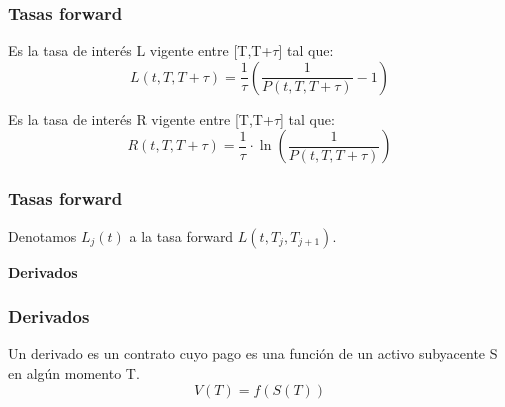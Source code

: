 
\begin{frame}
    \frametitle{Tasas forward}
    \begin{defin}
        Es la tasa de interés L vigente entre [T,T+$\tau$] tal que:
        \begin{equation*}
            L(t, T, T+\tau) = \frac{1}{\tau} \left( \frac{1}{P(t, T, T+\tau)} - 1\right)
        \end{equation*}
    \end{defin}
    \begin{defin}
        Es la tasa de interés R vigente entre [T,T+$\tau$] tal que:
        \begin{equation*}
            R(t, T, T+\tau) = \frac{1}{\tau} \cdot \ln\left(\frac{1}{P(t, T, T+\tau)}\right)
        \end{equation*}
    \end{defin}
\end{frame}

\begin{frame}
    \frametitle{Tasas forward}
    \begin{notat}
        Denotamos $L_j(t)$ a la tasa forward $L(t, T_j, T_{j+1})$.
    \end{notat}

\end{frame}

\begin{frame}
    \begin{center}
        \textbf{\huge Derivados}
    \end{center}
\end{frame}


\begin{frame}
    \frametitle{Derivados}
    \begin{defin}[Derivado]
        Un derivado es un contrato cuyo pago es una función de un activo subyacente S en algún momento T.
        \[V(T) = f(S(T))\]
    \end{defin}
\end{frame}

